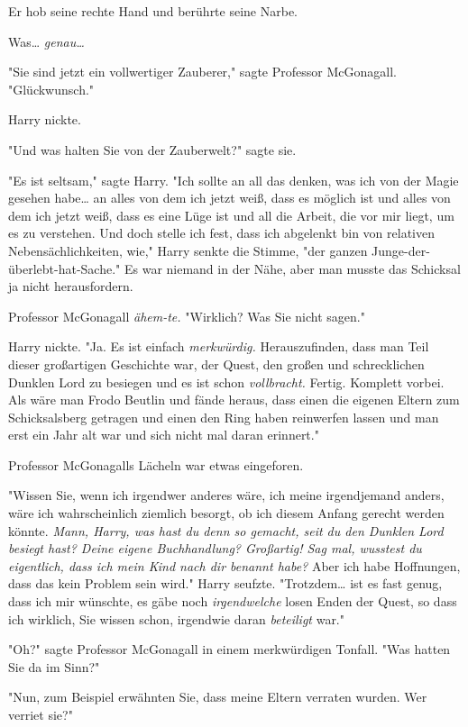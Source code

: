 {Er hob seine rechte Hand und berührte seine Narbe.

Was… \emph{genau…}

"Sie sind jetzt ein vollwertiger Zauberer," sagte Professor McGonagall. "Glückwunsch."

Harry nickte.

"Und was halten Sie von der Zauberwelt?" sagte sie.

"Es ist seltsam," sagte Harry. "Ich sollte an all das denken, was ich von der Magie gesehen habe… an alles von dem ich jetzt weiß, dass es möglich ist und alles von dem ich jetzt weiß, dass es eine Lüge ist und all die Arbeit, die vor mir liegt, um es zu verstehen. Und doch stelle ich fest, dass ich abgelenkt bin von relativen Nebensächlichkeiten, wie," Harry senkte die Stimme, "der ganzen Junge-der-überlebt-hat-Sache." Es war niemand in der Nähe, aber man musste das Schicksal ja nicht herausfordern.

Professor McGonagall \emph{ähem-te.} "Wirklich? Was Sie nicht sagen."

Harry nickte. "Ja. Es ist einfach \emph{merkwürdig.} Herauszufinden, dass man Teil dieser großartigen Geschichte war, der Quest, den großen und schrecklichen Dunklen Lord zu besiegen und es ist schon \emph{vollbracht.} Fertig. Komplett vorbei. Als wäre man Frodo Beutlin und fände heraus, dass einen die eigenen Eltern zum Schicksalsberg getragen und einen den Ring haben reinwerfen lassen und man erst ein Jahr alt war und sich nicht mal daran erinnert."

Professor McGonagalls Lächeln war etwas eingeforen.

"Wissen Sie, wenn ich irgendwer anderes wäre, ich meine irgendjemand anders, wäre ich wahrscheinlich ziemlich besorgt, ob ich diesem Anfang gerecht werden könnte. \emph{Mann, Harry, was hast du denn so gemacht, seit du den Dunklen Lord besiegt hast? Deine eigene Buchhandlung? Großartig! Sag mal, wusstest du eigentlich, dass ich mein Kind nach dir benannt habe?} Aber ich habe Hoffnungen, dass das kein Problem sein wird." Harry seufzte. "Trotzdem… ist es fast genug, dass ich mir wünschte, es gäbe noch \emph{irgendwelche} losen Enden der Quest, so dass ich wirklich, Sie wissen schon, irgendwie daran \emph{beteiligt} war."

"Oh?" sagte Professor McGonagall in einem merkwürdigen Tonfall. "Was hatten Sie da im Sinn?"

"Nun, zum Beispiel erwähnten Sie, dass meine Eltern verraten wurden. Wer verriet sie?"

}

